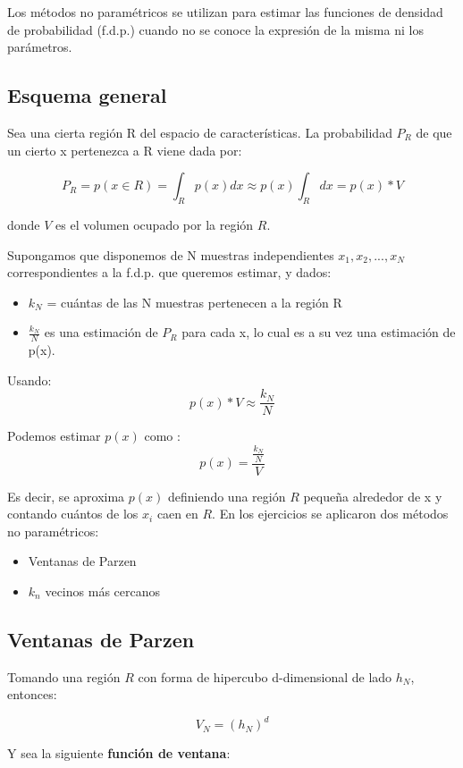 Los métodos no paramétricos se utilizan para estimar las funciones de densidad de probabilidad (f.d.p.) cuando no se conoce la expresión de la misma ni los parámetros.

\subsection{Esquema general}

Sea una cierta región R del espacio de características. La probabilidad $P_R$ de que un cierto x pertenezca a R viene dada por:

\[ P_R = p(x \in R) = \int_{R} p(x) dx \approx p(x) \int_{R} dx = p(x)*V \]

donde $V$ es el volumen ocupado por la región $R$.

Supongamos que disponemos de N muestras independientes $x_1
, x_2, ..., x_N$ correspondientes a la f.d.p. que queremos estimar, y dados:

\begin{itemize}
\item $k_N$ = cuántas de las N muestras pertenecen a la región R
\item $\frac{k_N}{N}$ es una estimación de $P_R$ para cada x, lo cual es a su vez una estimación de p(x).
\end{itemize}

Usando:
\[ p(x)*V \approx \frac{k_N}{N} \]

Podemos estimar $p(x)$ como :
\[ p(x) = \frac{\frac{k_N}{N}}{V} \]

Es decir, se aproxima $p(x)$ definiendo una región $R$ pequeña alrededor de x y contando cuántos de los $x_i$ caen en $R$.
En los ejercicios se aplicaron dos métodos no paramétricos: 

\begin{itemize}
\item Ventanas de Parzen
\item $k_{n}$ vecinos más cercanos
\end{itemize}

\subsection{Ventanas de Parzen}

Tomando una región $R$ con forma de hipercubo d-dimensional de lado $h_N$, entonces:

\[ V_N = (h_N)^d \]

Y sea la siguiente \textbf{función de ventana}:


